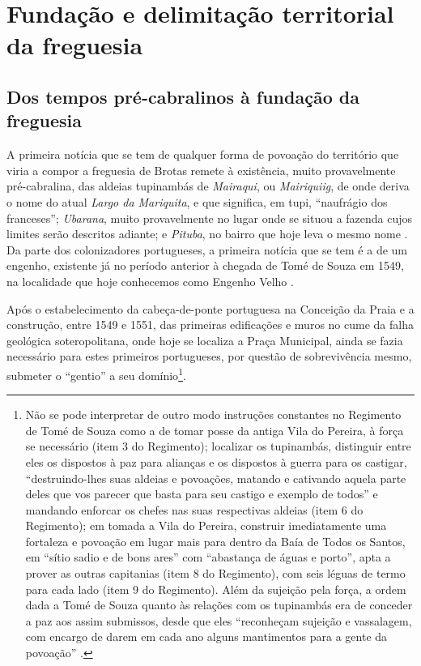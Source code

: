 \section{Fundação e delimitação territorial da freguesia}\label{sec:2.1}

\subsection{Dos tempos pré-cabralinos à fundação da freguesia}

A primeira notícia que se tem de qualquer forma de povoação do território que viria a compor a freguesia de Brotas remete à existência, muito provavelmente pré-cabralina, das aldeias tupinambás de \textit{Mairaqui}, ou \textit{Mairiquiig}, de onde deriva o nome do atual \textit{Largo da Mariquita}, e que significa, em tupi, ``naufrágio dos franceses''; \textit{Ubarana}, muito provavelmente no lugar onde se situou a fazenda cujos limites serão descritos adiante; e \textit{Pituba}, no bairro que hoje leva o mesmo nome \cite{azevedo_povoamento_1969,dorea_ruas_1999,sampaio_salvador_2016,VASCONCELOS2002}. Da parte dos colonizadores portugueses, a primeira notícia que se tem é a de um engenho, existente já no período anterior à chegada de Tomé de Souza em 1549, na localidade que hoje conhecemos como Engenho Velho \cite[p.~235]{sampaio_salvador_2016}.

Após o estabelecimento da cabeça-de-ponte portuguesa na Conceição da Praia e a construção, entre 1549 e 1551, das primeiras edificações e muros no cume da falha geológica soteropolitana, onde hoje se localiza a Praça Municipal, ainda se fazia necessário para estes primeiros portugueses, por questão de sobrevivência mesmo, submeter o ``gentio'' a seu domínio\footnote{Não se pode interpretar de outro modo instruções constantes no Regimento de Tomé de Souza como a de tomar posse da antiga Vila do Pereira, à força se necessário (item 3 do Regimento); localizar os tupinambás, distinguir entre eles os dispostos à paz para alianças e os dispostos à guerra para os castigar, ``destruindo-lhes suas aldeias e povoações, matando e cativando aquela parte deles que vos parecer que basta para seu castigo e exemplo de todos'' e mandando enforcar os chefes nas suas respectivas aldeias (item 6 do Regimento); em tomada a Vila do Pereira, construir imediatamente uma fortaleza e povoação em lugar mais para dentro da Baía de Todos os Santos, em ``sítio sadio e de bons ares'' com ``abastança de águas e porto'', apta a prover as outras capitanias (item 8 do Regimento), com seis léguas de termo para cada lado (item 9 do Regimento). Além da sujeição pela força, a ordem dada a Tomé de Souza quanto às relações com os tupinambás era de conceder a paz aos assim submissos, desde que eles ``reconheçam sujeição e vassalagem, com encargo de darem em cada ano alguns mantimentos para a gente da povoação'' \cite[pp.~81-101]{ruy_politica_1949}.}.

